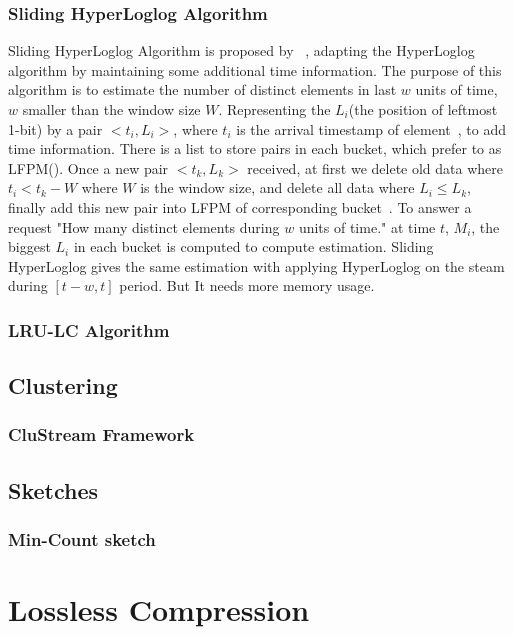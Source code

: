 \subsubsection{Sliding HyperLoglog Algorithm}
Sliding HyperLoglog Algorithm is proposed by ~\cite{chabchoub2010sliding},
adapting the HyperLoglog algorithm by maintaining some additional time
information. The purpose of this algorithm is to estimate the number of distinct
elements in last $w$ units of time, $w$ smaller than the window size $W$.
Representing the $L_i$(the position of leftmost 1-bit) by a pair $<t_i, L_i>$,
where $t_i$ is the arrival timestamp of element~\cite{chabchoub2010sliding}, to
add time information. There is a list to store pairs in each bucket, which
prefer to as LFPM(). Once a new pair
$<t_k, L_k>$ received, at first we delete old data where $t_i < t_k - W$ where
$W$ is the window size, and delete all data where $L_i \leq L_k$, finally add
this new pair into LFPM of corresponding bucket~\cite{chabchoub2010sliding}. To
answer a request "How many distinct elements during $w$ units of time." at time
$t$, $M_i$, the biggest $L_i$ in each bucket is computed to compute estimation.
Sliding HyperLoglog gives the same estimation with applying HyperLoglog on the
steam during $[t-w, t]$ period. But It needs more memory usage.

\subsubsection{LRU-LC Algorithm}


\subsection{Clustering}
\subsubsection{CluStream Framework}

\subsection{Sketches}
\subsubsection{Min-Count sketch}

\section{Lossless Compression}
